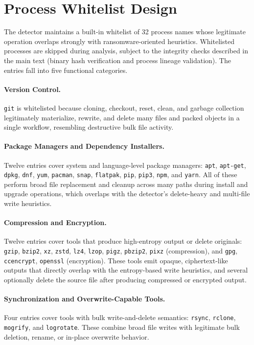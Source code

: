 \documentclass[twocolumn, 10pt]{scrartcl}
\begin{document}
\section{Process Whitelist Design}
\label{app:whitelist}

The detector maintains a built-in whitelist of 32 process names whose legitimate
operation overlaps strongly with ransomware-oriented heuristics. Whitelisted
processes are skipped during analysis, subject to the integrity checks described
in the main text (binary hash verification and process lineage validation).
The entries fall into five functional categories.

\paragraph{Version Control.}
\texttt{git} is whitelisted because cloning, checkout, reset, clean, and garbage
collection legitimately materialize, rewrite, and delete many files and packed
objects in a single workflow, resembling destructive bulk file activity.

\paragraph{Package Managers and Dependency Installers.}
Twelve entries cover system and language-level package managers:
\texttt{apt}, \texttt{apt-get}, \texttt{dpkg}, \texttt{dnf}, \texttt{yum},
\texttt{pacman}, \texttt{snap}, \texttt{flatpak}, \texttt{pip}, \texttt{pip3},
\texttt{npm}, and \texttt{yarn}. All of these perform broad file replacement and
cleanup across many paths during install and upgrade operations, which overlaps
with the detector's delete-heavy and multi-file write heuristics.

\paragraph{Compression and Encryption.}
Twelve entries cover tools that produce high-entropy output or delete originals:
\texttt{gzip}, \texttt{bzip2}, \texttt{xz}, \texttt{zstd}, \texttt{lz4},
\texttt{lzop}, \texttt{pigz}, \texttt{pbzip2}, \texttt{pixz} (compression),
and \texttt{gpg}, \texttt{ccencrypt}, \texttt{openssl} (encryption). These
tools emit opaque, ciphertext-like outputs that directly overlap with the
entropy-based write heuristics, and several optionally delete the source file
after producing compressed or encrypted output.

\paragraph{Synchronization and Overwrite-Capable Tools.}
Four entries cover tools with bulk write-and-delete semantics:
\texttt{rsync}, \texttt{rclone}, \texttt{mogrify}, and \texttt{logrotate}.
These combine broad file writes with legitimate bulk deletion, rename, or
in-place overwrite behavior.
\end{document}
